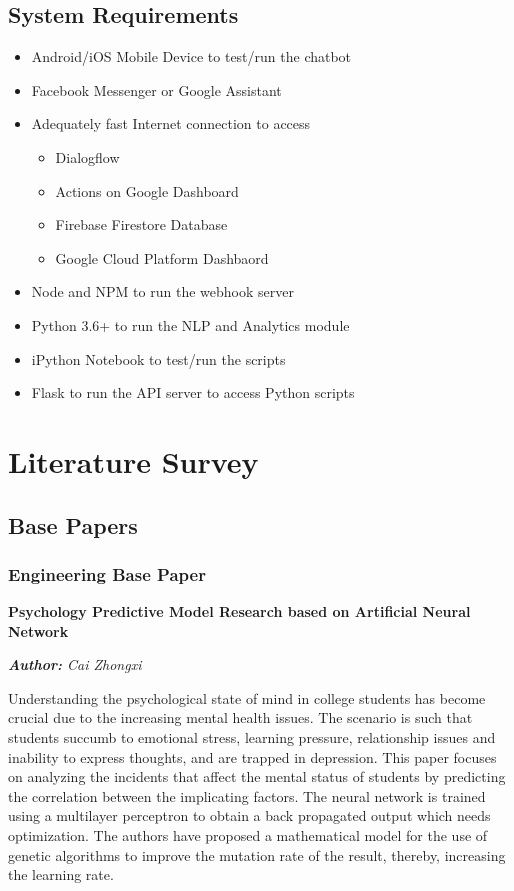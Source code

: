 \documentclass[conference,compsoc]{IEEEtran}
\begin{document}
\subsection{System Requirements}
\begin{itemize}
    \item Android/iOS Mobile Device to test/run the chatbot
    \item Facebook Messenger or Google Assistant
    \item Adequately fast Internet connection to access
    \begin{itemize}    
        \item Dialogflow
        \item Actions on Google Dashboard
        \item Firebase Firestore Database
        \item Google Cloud Platform Dashbaord
    \end{itemize}
    \item Node and NPM to run the webhook server
    \item Python 3.6+ to run the NLP and Analytics module
    \item iPython Notebook to test/run the scripts
    \item Flask to run the API server to access Python scripts
\end{itemize}


\section{Literature Survey}

\subsection{Base Papers}

\subsubsection{Engineering Base Paper}

\noindent
\textbf{Psychology Predictive Model Research based on Artificial Neural Network}

\noindent
\textit{\textbf{Author:} Cai Zhongxi}

Understanding the psychological state of mind in college students has become crucial due to the increasing mental health issues. The scenario is such that students succumb to emotional stress, learning pressure, relationship issues and inability to express thoughts, and are trapped in depression. This paper focuses on analyzing the incidents that affect the mental status of students by predicting the correlation between the implicating factors. The neural network is trained using a multilayer perceptron to obtain a back propagated output which needs optimization. The authors have proposed a mathematical model for the use of genetic algorithms to improve the mutation rate of the result, thereby, increasing the learning rate.
\end{document}
